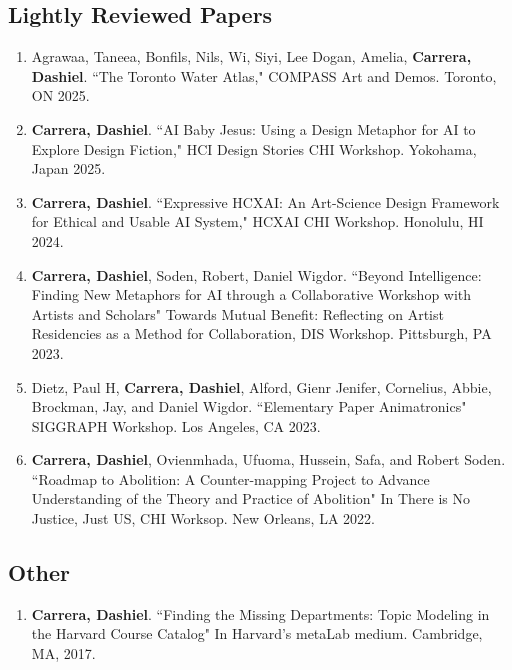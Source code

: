 \subsection{Lightly Reviewed Papers}
\begin{enumerate}

 \item Agrawaa, Taneea, Bonfils, Nils, Wi, Siyi, Lee Dogan, Amelia, \textbf{Carrera, Dashiel}. ``The Toronto Water Atlas," COMPASS Art and Demos. Toronto, ON 2025. \\

 \item \textbf{Carrera, Dashiel}. ``AI Baby Jesus: Using a Design Metaphor for AI to Explore Design Fiction," HCI Design Stories CHI Workshop. Yokohama, Japan 2025. \\
 \item \textbf{Carrera, Dashiel}. ``Expressive HCXAI: An Art-Science Design Framework for Ethical and Usable AI System," HCXAI CHI Workshop. Honolulu, HI 2024. \\
  \item \textbf{Carrera, Dashiel}, Soden, Robert, Daniel Wigdor. ``Beyond Intelligence: Finding New Metaphors for AI through a Collaborative Workshop with Artists and Scholars" Towards Mutual Benefit: Reflecting on Artist Residencies as a Method for Collaboration, DIS Workshop. Pittsburgh, PA 2023. \\
   \item  Dietz, Paul H, \textbf{Carrera, Dashiel}, Alford, Gienr Jenifer, Cornelius, Abbie, Brockman, Jay, and Daniel Wigdor. ``Elementary Paper Animatronics" SIGGRAPH Workshop. Los Angeles, CA 2023. \\
  \item \textbf{Carrera, Dashiel}, Ovienmhada, Ufuoma, Hussein, Safa, and Robert Soden. ``Roadmap to Abolition: A Counter-mapping Project to Advance Understanding of the Theory and Practice of Abolition" In There is No Justice, Just US, CHI Worksop. New Orleans, LA 2022. 
  \end{enumerate}
  
\subsection{Other}
\begin{enumerate}
\item \textbf{Carrera, Dashiel}. ``Finding the Missing Departments: Topic Modeling in the Harvard Course Catalog" In Harvard's metaLab medium. Cambridge, MA, 2017.\\
\end{enumerate} 



